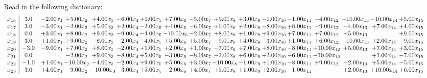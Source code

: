 \documentclass[9pt]{article}
\begin{document}
Read in the following dictionary:
\[\begin{array}{c| c c@{\hskip 2pt} c@{\hskip 2pt} c@{\hskip 2pt} c@{\hskip 2pt} c@{\hskip 2pt} c@{\hskip 2pt} c@{\hskip 2pt} c@{\hskip 2pt} c@{\hskip 2pt} c@{\hskip 2pt} c@{\hskip 2pt} c@{\hskip 2pt} c@{\hskip 2pt} c@{\hskip 2pt} c@{\hskip 2pt} }
 x_{16}   &  3.0 & -2.00 x_{1} & +  5.00 x_{2} & +  4.00 x_{3} & -6.00 x_{4} & +  1.00 x_{5} & +  7.00 x_{6} & -5.00 x_{7} & +  9.00 x_{8} & +  3.00 x_{9} & -1.00 x_{10} & -1.00 x_{11} & -4.00 x_{12} & + 10.00 x_{13} & -10.00 x_{14} & +  5.00 x_{15}\\
 x_{17}   &  3.0 & -3.00 x_{1} & -2.00 x_{2} & +  5.00 x_{3} & +  2.00 x_{4} & -2.00 x_{5} & +  4.00 x_{6} & -6.00 x_{7} & +  6.00 x_{8} & +  2.00 x_{9} & -8.00 x_{10} & +  8.00 x_{11} & -9.00 x_{12} & -4.00 x_{13} & +  7.00 x_{14} & +  4.00 x_{15}\\
 x_{18}   &  0.0 & +  3.00 x_{1} & +  8.00 x_{2} & +  9.00 x_{3} & -9.00 x_{4} & -4.00 x_{5} & -10.00 x_{6} & -2.00 x_{7} & +  8.00 x_{8} & +  1.00 x_{9} & +  9.00 x_{10} & +  7.00 x_{11} & +  7.00 x_{12} & -5.00 x_{13} &   & +  9.00 x_{15}\\
 x_{19}   &  3.0 & +  1.00 x_{1} & +  9.00 x_{2} & -6.00 x_{3} & -2.00 x_{4} & -4.00 x_{5} & +  5.00 x_{6} & +  5.00 x_{7} & -9.00 x_{8} & +  4.00 x_{9} & -3.00 x_{10} & +  1.00 x_{11} & +  6.00 x_{12} & + 10.00 x_{13} & +  2.00 x_{14} & -9.00 x_{15}\\
 x_{20}   &  -3.0 & -9.00 x_{1} & +  7.00 x_{2} & +  8.00 x_{3} & -2.00 x_{4} & +  1.00 x_{5} & +  2.00 x_{6} & +  1.00 x_{7} & -7.00 x_{8} & +  7.00 x_{9} & +  8.00 x_{10} & -8.00 x_{11} & + 10.00 x_{12} & +  5.00 x_{13} & +  7.00 x_{14} & +  3.00 x_{15}\\
 x_{21}   &  0.0  &   & -2.00 x_{2} & +  9.00 x_{3} & -8.00 x_{4} & +  5.00 x_{5} & -3.00 x_{6} & -8.00 x_{7} & -2.00 x_{8} & +  6.00 x_{9} & +  2.00 x_{10} & -6.00 x_{11} & -10.00 x_{12} &   & +  1.00 x_{14} & -7.00 x_{15}\\
 x_{22}   &  -1.0 & +  1.00 x_{1} & -10.00 x_{2} & -4.00 x_{3} & -2.00 x_{4} & +  9.00 x_{5} & +  5.00 x_{6} & +  3.00 x_{7} & -10.00 x_{8} & -1.00 x_{9} & +  1.00 x_{10} & -8.00 x_{11} & +  9.00 x_{12} & -2.00 x_{13} & +  5.00 x_{14} & -5.00 x_{15}\\
 x_{23}   &  3.0 & +  4.00 x_{1} & -9.00 x_{2} & -10.00 x_{3} & -3.00 x_{4} & +  5.00 x_{5} & -2.00 x_{6} & +  4.00 x_{7} & +  5.00 x_{8} & +  1.00 x_{9} & +  2.00 x_{10} & -1.00 x_{11} &   & +  2.00 x_{13} & + 10.00 x_{14} & +  6.00 x_{15}\\

\end{array}\]
\end{document}

